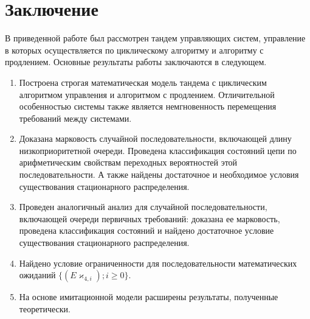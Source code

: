 \chapter*{Заключение}						%


В приведенной работе был рассмотрен тандем управляющих систем, управление в которых осуществляется по циклическому алгоритму и алгоритму с продлением. Основные результаты работы заключаются в следующем.

    \begin{enumerate}
        \item Построена строгая математическая модель тандема с циклическим алгоритмом управления и алгоритмом с продлением. Отличительной особенностью системы также является немгновенность перемещения требований между системами. 
        \item Доказана марковость случайной последовательности, включающей длину низкоприоритетной очереди. Проведена классификация состояний цепи по арифметическим свойствам переходных вероятностей этой последовательности. А также найдены достаточное и необходимое условия существования стационарного распределения.
        \item Проведен аналогичный анализ для случайной последовательности, включающей очереди первичных требований: доказана ее марковость, проведена классификация состояний и найдено достаточное условие существования стационарного распределения.
        \item Найдено условие ограниченности для последовательности математических ожиданий $    \{( E\varkappa_{4,i}); i \geqslant 0\}$.
        \item На основе имитационной модели расширены результаты, полученные теоретически.
    \end{enumerate}


